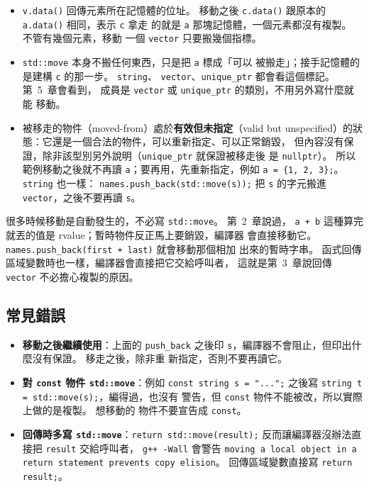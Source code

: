 \begin{itemize}
\item \texttt{v.data()} 回傳元素所在記憶體的位址。 移動之後
\texttt{c.data()} 跟原本的 \texttt{a.data()} 相同，表示 \texttt{c} 拿走
的就是 \texttt{a} 那塊記憶體，一個元素都沒有複製。 不管有幾個元素，移動
一個 \texttt{vector} 只要搬幾個指標。
\item \texttt{std::move} 本身不搬任何東西，只是把 \texttt{a} 標成「可以
被搬走」；接手記憶體的是建構 \texttt{c} 的那一步。 \texttt{string}、
\texttt{vector}、\texttt{unique\_ptr} 都會看這個標記。 第~5~章會看到，
成員是 \texttt{vector} 或 \texttt{unique\_ptr} 的類別，不用另外寫什麼就能
移動。
\item 被移走的物件（moved-from）處於\textbf{有效但未指定}（valid but
unspecified）的狀態：它還是一個合法的物件，可以重新指定、可以正常銷毀，
但內容沒有保證，除非該型別另外說明（\texttt{unique\_ptr} 就保證被移走後
是 \texttt{nullptr}）。 所以範例移動之後就不再讀 \texttt{a}；要再用，先重新指定，例如
\texttt{a = \{1, 2, 3\};}。 \texttt{string} 也一樣：
\texttt{names.push\_back(std::move(s));} 把 \texttt{s} 的字元搬進
\texttt{vector}，之後不要再讀 \texttt{s}。
\end{itemize}

很多時候移動是自動發生的，不必寫 \texttt{std::move}。 第~2~章說過，
\texttt{a + b} 這種算完就丟的值是 rvalue；暫時物件反正馬上要銷毀，編譯器
會直接移動它。 \texttt{names.push\_back(first + last)} 就會移動那個相加
出來的暫時字串。 函式回傳區域變數時也一樣，編譯器會直接把它交給呼叫者，
這就是第~3~章說回傳 \texttt{vector} 不必擔心複製的原因。

\subsection{常見錯誤}

\begin{itemize}
\item \textbf{移動之後繼續使用}：上面的 \texttt{push\_back} 之後印
\texttt{s}，編譯器不會阻止，但印出什麼沒有保證。 移走之後，除非重
新指定，否則不要再讀它。
\item \textbf{對 \texttt{const} 物件 \texttt{std::move}}：例如
\texttt{const string s = "...";} 之後寫 \texttt{string t =
std::move(s);}，編得過，也沒有
警告，但 \texttt{const} 物件不能被改，所以實際上做的是複製。 想移動的
物件不要宣告成 \texttt{const}。
\item \textbf{回傳時多寫 \texttt{std::move}}：\texttt{return
std::move(result);} 反而讓編譯器沒辦法直接把 \texttt{result} 交給呼叫者，
\texttt{g++ -Wall} 會警告 \texttt{moving a local object in a return
statement prevents copy elision}。 回傳區域變數直接寫
\texttt{return result;}。
\end{itemize}

